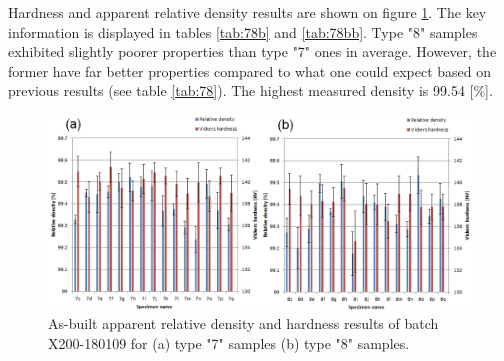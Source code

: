 Hardness and apparent relative density results are shown on figure \ref{fig:HD-171024}. The key information is displayed in tables \ref{tab:78b} and \ref{tab:78bb}. Type "8" samples exhibited slightly poorer properties than type "7" ones in average. However, the former have far better properties compared to what one could expect based on previous results (see table \ref{tab:78}). The highest measured density is 99.54 [\%].\\

\begin{figure}[ht]
\centering
\centerline{\includegraphics[scale=0.65]{Images/HD-180109-both}}
\decoRule
\caption[As-built apparent relative density and hardness results of batch X200-180109 for (a) type "7" samples (b) type "8" samples.]{As-built apparent relative density and hardness results of batch X200-180109 for (a) type "7" samples (b) type "8" samples.}
\label{fig:HD-171024}
\end{figure} 

 \begin{center}
\begin{table}[ht]
\noindent{}

\caption[Standard deviations and average values for apparent relative densities and hardnesses of types "7" and "8" specimens of batch X200-180109]{Standard deviations and average values for apparent relative densities and hardnesses of types "7" and "8" specimens of batch X200-180109}
\label{tab:78b}
\end{table}
 \end{center}
 
